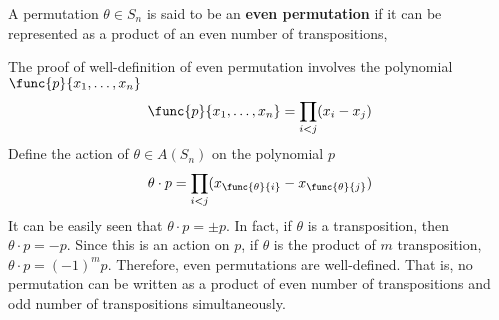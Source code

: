 \begin{definition}
    A permutation \(\theta \in S_n\) is said to be an \textbf{even permutation} if it can be represented as a product of an even number of transpositions, 
\end{definition}

The proof of well-definition of even permutation involves the polynomial \(\func{p}{x_1, \dots,x_n}\)
\begin{equation*}
    \func{p}{x_1,\dots, x_n} = \prod_{i < j} (x_i - x_j)
\end{equation*}
Define the action of \(\theta \in A(S_n)\) on the polynomial \(p\)
\begin{equation*}
    \theta \cdot p = \prod_{i < j} (x_{\func{\theta}{i}} - x_{\func{\theta}{j}})
\end{equation*}
It can be easily seen that \(\theta \cdot p = \pm p\). In fact, if \(\theta\) is a transposition, then \(\theta \cdot p = -p\). Since this is an action on \(p\), if \(\theta\) is the product of \(m\) transposition, \(\theta \cdot p = (-1)^m p\). Therefore, even permutations are well-defined. That is, no permutation can be written as a product of even number of transpositions and odd number of transpositions simultaneously.

